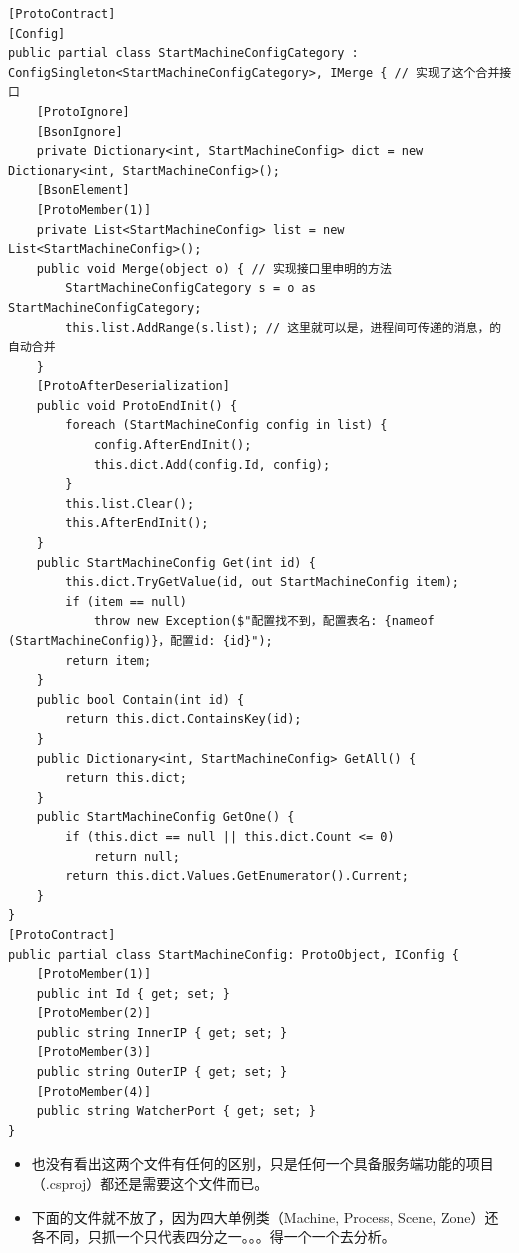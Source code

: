 \documentclass[9pt, b5paper]{article}
\begin{document}
\begin{verbatim}
[ProtoContract]
[Config]
public partial class StartMachineConfigCategory : ConfigSingleton<StartMachineConfigCategory>, IMerge { // 实现了这个合并接口
    [ProtoIgnore]
    [BsonIgnore]
    private Dictionary<int, StartMachineConfig> dict = new Dictionary<int, StartMachineConfig>();
    [BsonElement]
    [ProtoMember(1)]
    private List<StartMachineConfig> list = new List<StartMachineConfig>();
    public void Merge(object o) { // 实现接口里申明的方法
        StartMachineConfigCategory s = o as StartMachineConfigCategory;
        this.list.AddRange(s.list); // 这里就可以是，进程间可传递的消息，的自动合并
    }
    [ProtoAfterDeserialization]        
    public void ProtoEndInit() {
        foreach (StartMachineConfig config in list) {
            config.AfterEndInit();
            this.dict.Add(config.Id, config);
        }
        this.list.Clear();
        this.AfterEndInit();
    }
    public StartMachineConfig Get(int id) {
        this.dict.TryGetValue(id, out StartMachineConfig item);
        if (item == null) 
            throw new Exception($"配置找不到，配置表名: {nameof (StartMachineConfig)}，配置id: {id}");
        return item;
    }
    public bool Contain(int id) {
        return this.dict.ContainsKey(id);
    }
    public Dictionary<int, StartMachineConfig> GetAll() {
        return this.dict;
    }
    public StartMachineConfig GetOne() {
        if (this.dict == null || this.dict.Count <= 0) 
            return null;
        return this.dict.Values.GetEnumerator().Current;
    }
}
[ProtoContract]
public partial class StartMachineConfig: ProtoObject, IConfig {
    [ProtoMember(1)]
    public int Id { get; set; }
    [ProtoMember(2)]
    public string InnerIP { get; set; }
    [ProtoMember(3)]
    public string OuterIP { get; set; }
    [ProtoMember(4)]
    public string WatcherPort { get; set; }
}
\end{verbatim}
\begin{itemize}
\item 也没有看出这两个文件有任何的区别，只是任何一个具备服务端功能的项目（.csproj）都还是需要这个文件而已。
\item 下面的文件就不放了，因为四大单例类（Machine, Process, Scene, Zone）还各不同，只抓一个只代表四分之一。。。得一个一个去分析。
\end{itemize}
\end{document}
